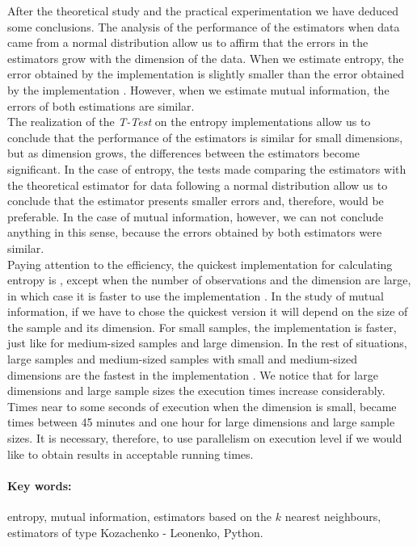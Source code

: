 After the theoretical study and the practical experimentation we have deduced some conclusions. The analysis of the performance of the estimators when data came from a normal distribution allow us to affirm that the errors in the estimators grow with the dimension of the data. When we estimate entropy, the error obtained by the implementation \cite{estimating} is slightly smaller than the error obtained by the implementation \cite{npeet}. However, when we estimate mutual information, the errors of both estimations are similar.\\

The realization of the \textit{T-Test} on the entropy implementations allow us to conclude that the performance of the estimators is similar for small dimensions, but as dimension grows, the differences between the estimators become significant. In the case of entropy, the tests made comparing the estimators with the theoretical estimator for data following a normal distribution allow us to conclude that the estimator \cite{estimating} presents smaller errors and, therefore, would be preferable. In the case of mutual information, however, we can not conclude anything in this sense, because the errors obtained by both estimators were similar.\\

Paying attention to the efficiency, the quickest implementation for calculating entropy is \cite{npeet}, except when the number of observations and the dimension are large, in which case it is faster to use the implementation \cite{estimating}. In the study of mutual information, if we have to chose the quickest version it will depend on the size of the sample and its dimension. For small samples, the implementation \cite{npeet} is faster, just like for medium-sized samples and large dimension. In the rest of situations, large samples and medium-sized samples with small and medium-sized dimensions are the fastest in the implementation \cite{estimating}. We notice that for large dimensions and large sample sizes the execution times increase considerably. Times near to some seconds of execution when the dimension is small, became times between 45 minutes and one hour for large dimensions and large sample sizes. It is necessary, therefore, to use parallelism on execution level if we would like to obtain results in acceptable running times.\\

\paragraph{Key words:} entropy, mutual information, estimators based on the $k$ nearest neighbours, estimators of type Kozachenko - Leonenko, Python.
